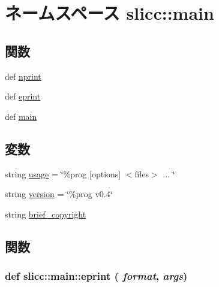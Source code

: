 \hypertarget{namespaceslicc_1_1main}{
\section{ネームスペース slicc::main}
\label{namespaceslicc_1_1main}
}
\subsection*{関数}
\begin{DoxyCompactItemize}
\item 
def \hyperlink{namespaceslicc_1_1main_aebac5c03acd3f8585332f16a87600941}{nprint}
\item 
def \hyperlink{namespaceslicc_1_1main_a300cf9af1a1c9ff1546a9a6b2fb79d7c}{eprint}
\item 
def \hyperlink{namespaceslicc_1_1main_aa4ab6984fcc6ca3c4400301d7ce54798}{main}
\end{DoxyCompactItemize}
\subsection*{変数}
\begin{DoxyCompactItemize}
\item 
string \hyperlink{namespaceslicc_1_1main_a61e5f066c879e5430d8f713c2c3a8b31}{usage} = \char`\"{}\%prog \mbox{[}options\mbox{]} $<$files$>$ ... \char`\"{}
\item 
string \hyperlink{namespaceslicc_1_1main_af9c8593b58583463efe6932e24c9d6e6}{version} = \char`\"{}\%prog v0.4\char`\"{}
\item 
string \hyperlink{namespaceslicc_1_1main_a61508e4c829139942377f4782729bb82}{brief\_\-copyright}
\end{DoxyCompactItemize}


\subsection{関数}
\hypertarget{namespaceslicc_1_1main_a300cf9af1a1c9ff1546a9a6b2fb79d7c}{
\subsubsection[{eprint}]{\setlength{\rightskip}{0pt plus 5cm}def slicc::main::eprint ( {\em format}, \/   {\em args})}}
\label{namespaceslicc_1_1main_a300cf9af1a1c9ff1546a9a6b2fb79d7c}



